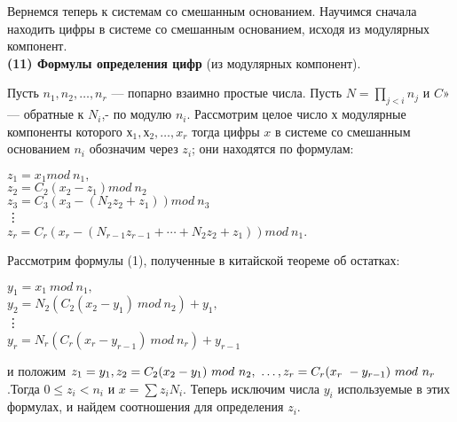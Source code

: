 \documentclass{mai_book}
\begin{document}
\pagebreak
\newpage

Вернемся теперь к системам со смешанным основанием. Научимся
сначала находить цифры в системе со смешанным основанием, исходя
из модулярных компонент.\\
\textbf{(11) Формулы определения цифр} (из модулярных компонент).\par
 Пусть $n_1,n_2,\ldots, n_r$ — попарно взаимно простые числа. Пусть
$N = \prod_{j<i} n_{j}$ и $C$» — обратные к $N_{i}$,- по модулю $n_{i}$. Рассмотрим целое число $х$ модулярные компоненты которого $х_{1},х_{2},\ldots, x_{r}$ тогда цифры $x$ в системе со смешанным основанием $n_{i}$ обозначим через $z_i$; они находятся по формулам:
\begin{flushleft}
\hspace{72pt}$z_{1} = x_{1} mod\ n_1,$ \\
\hspace{72pt}$z_{2} = C_{2}(x_{2} - z_{1}) mod\ n_{2}$ \\
\hspace{72pt}$z_{3} = C_{3}(x_{3} - (N_{2}z_{2} + z_{1}))mod\ n_{3}$ \\
\hspace{85pt}\vdots  \\
\hspace{72pt}$z_{r} = C_{r}(x_{r} - (N_{r-1}z_{r-1}+\cdots+N_{2}z_{2}+z_{1}))mod\ n_{1}.$
\end{flushleft}
\begin{myproof}
Рассмотрим формулы (1), полученные в китайской теореме об остатках:
\begin{flushleft}
\hspace{72pt}$y_{1} = x_{1}\ mod\ n_{1},$  \\
\hspace{72pt}$y_{2} = N_{2}(C_{2}(x_{2}-y_{1})\ mod\ n_{2})+ y_{1},$  \\
\hspace{85pt}\vdots \\
\hspace{72pt}$y_{r} = N_{r}(C_{r}(x_{r}-y_{r-1})\ mod\ n_{r})+y_{r-1}$ \\
\end{flushleft}
и положим $z_{1} = y_{1}, z_{2} = C_{2}(x_{2} - y_{1})\ mod\ n_{2},\ \ldots, z_r = C_{r}(x_{r}\ -\linebreak y_{r-1})\ mod\ n_{r} $.Тогда $0 \leq z_{i} < n_{i}$ и $x =\sum z_{i}N_{i}$. Теперь исключим числа $y_{i}$ используемые в этих формулах, и найдем соотношения\linebreak
для определения $z_{i}$.
\end{myproof}
\end{document}
